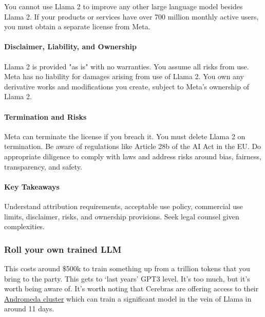 You cannot use Llama 2 to improve any other large language model besides Llama 2.
If your products or services have over 700 million monthly active users, you must obtain a separate license from Meta.
\paragraph{Disclaimer, Liability, and Ownership}

Llama 2 is provided "as is" with no warranties. You assume all risks from use.
Meta has no liability for damages arising from use of Llama 2.
You own any derivative works and modifications you create, subject to Meta's ownership of Llama 2.
\paragraph{Termination and Risks}

Meta can terminate the license if you breach it. You must delete Llama 2 on termination.
Be aware of regulations like Article 28b of the AI Act in the EU. Do appropriate diligence to comply with laws and address risks around bias, fairness, transparency, and safety.
\paragraph{Key Takeaways}

Understand attribution requirements, acceptable use policy, commercial use limits, disclaimer, risks, and ownership provisions.
Seek legal counsel given complexities.

\subsubsection{Roll your own trained LLM}
This costs around \$500k to train something up from a trillion tokens that you bring to the party. This gets to `last years' GPT3 level. It's too much, but it's worth being aware of. It's worth noting that Cerebras are offering access to their \href{https://www.cerebras.net/press-release/cerebras-unveils-andromeda-a-13.5-million-core-ai-supercomputer-that-delivers-near-perfect-linear-scaling-for-large-language-models}{Andromeda cluster} which can train a significant model in the vein of Llama in around 11 days. 
